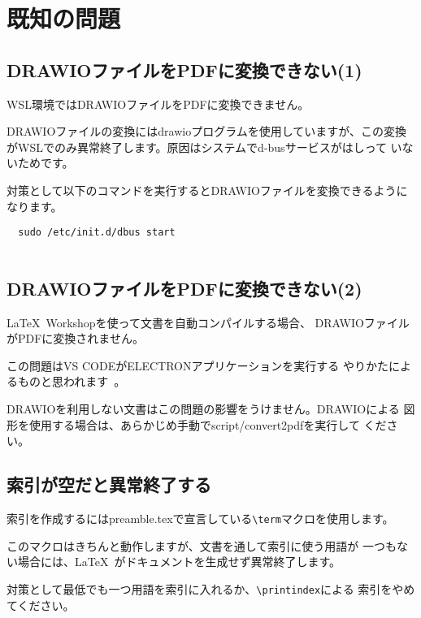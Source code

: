 \chapter{既知の問題}
\label{sec:appendix10}

\section{DRAWIOファイルをPDFに変換できない(1)}
WSL環境ではDRAWIOファイルをPDFに変換できません。

DRAWIOファイルの変換にはdrawioプログラムを使用していますが、この変換
がWSLでのみ異常終了します。原因はシステムでd-busサービスがはしって
いないためです。

対策として以下のコマンドを実行するとDRAWIOファイルを変換できるようになります。

\begin{lstlisting}
  sudo /etc/init.d/dbus start
  
\end{lstlisting}

\section{DRAWIOファイルをPDFに変換できない(2)}
\LaTeX\ Workshopを使って文書を自動コンパイルする場合、
DRAWIOファイルがPDFに変換されません。

この問題はVS CODEがELECTRONアプリケーションを実行する
やりかたによるものと思われます~\cite{ELECTRON_RUN_AS_NODE}。

DRAWIOを利用しない文書はこの問題の影響をうけません。DRAWIOによる
図形を使用する場合は、あらかじめ手動でscript/convert2pdfを実行して
ください。

\section{索引が空だと異常終了する}
索引を作成するにはpreamble.texで宣言している\lstinline{\term}マクロを使用します。

このマクロはきちんと動作しますが、文書を通して索引に使う用語が
一つもない場合には、\LaTeX\ がドキュメントを生成せず異常終了します。

対策として最低でも一つ用語を索引に入れるか、\lstinline{\printindex}による
索引をやめてください。

